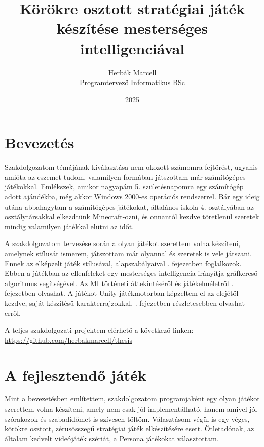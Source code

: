 \documentclass[
]{thesis-ekf}
\theoremstyle{definition}
\theoremstyle{remark}
\begin{document}
\title{Körökre osztott stratégiai játék készítése mesterséges intelligenciával}
\author{Herbák Marcell\\Programtervező Informatikus BSc}
\date{2025}
\maketitle

\tableofcontents

\chapter{Bevezetés}

Szakdolgozatom témájának kiválasztása nem okozott számomra fejtörést, ugyanis amióta az eszemet tudom, valamilyen formában játszottam már számítógépes játékokkal. Emlékszek, amikor nagyapám 5. születésnapomra egy számítógép adott ajándékba, még akkor Windows 2000-es operációs rendszerrel. Bár egy ideig utána abbahagytam a számítógépes játékokat, általános iskola 4. osztályában az osztálytársakkal elkezdtünk Minecraft-ozni, és onnantól kezdve töretlenül szeretek mindig valamilyen játékkal elütni az időt. 

A szakdolgozatom tervezése során a olyan játékot szerettem volna készíteni, amelynek stílusát ismerem, játszottam már olyannal és szeretek is vele játszani. Ennek az elképzelt játék stílusával, alapszabályaival . fejezetben foglalkozok. Ebben a játékban az ellenfeleket egy mesterséges intelligencia irányítja gráfkereső algoritmus segítségével. Az MI történeti áttekintéséről és játékelméletről . fejezetben olvashat. A játékot Unity játékmotorban képzeltem el az elejétől kezdve, saját készítésű karakterrajzokkal. . fejezetben részletesebben olvashat erről.

A teljes szakdolgozati projektem elérhető a következő linken: \url{https://github.com/herbakmarcell/thesis}

\chapter{A fejlesztendő játék} \label{dev-game}

Mint a bevezetésben említettem, szakdolgozatom programjaként egy olyan játékot szerettem volna készíteni, amely nem csak jól implementálható, hanem amivel jól szórakozok és szabadidőmet is szívesen töltöm. Választásom végül is egy véges, körökre osztott, zérusösszegű stratégiai játék elkészítésére esett. Ötletadónak, az általam kedvelt videójáték szériát, a Persona játékokat választottam. \cite{Persona}
\end{document}
